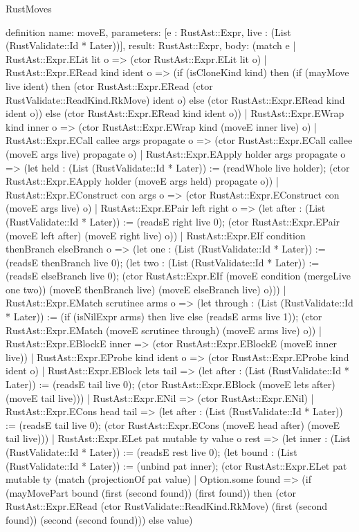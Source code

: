 \begin{lexlean}{RustMoves}
\begin{semanticmodule}
definition{
  name: moveE,
  parameters: [e : RustAst::Expr, live : (List (RustValidate::Id * Later))],
  result: RustAst::Expr,
  body: (match e
    | RustAst::Expr.ELit lit o => (ctor RustAst::Expr.ELit lit o)
    | RustAst::Expr.ERead kind ident o => (if (isCloneKind kind) then (if (mayMove live ident) then (ctor RustAst::Expr.ERead (ctor RustValidate::ReadKind.RkMove) ident o) else (ctor RustAst::Expr.ERead kind ident o)) else (ctor RustAst::Expr.ERead kind ident o))
    | RustAst::Expr.EWrap kind inner o => (ctor RustAst::Expr.EWrap kind (moveE inner live) o)
    | RustAst::Expr.ECall callee args propagate o => (ctor RustAst::Expr.ECall callee (moveE args live) propagate o)
    | RustAst::Expr.EApply holder args propagate o => (let held : (List (RustValidate::Id * Later)) := (readWhole live holder); (ctor RustAst::Expr.EApply holder (moveE args held) propagate o))
    | RustAst::Expr.EConstruct con args o => (ctor RustAst::Expr.EConstruct con (moveE args live) o)
    | RustAst::Expr.EPair left right o => (let after : (List (RustValidate::Id * Later)) := (readsE right live 0); (ctor RustAst::Expr.EPair (moveE left after) (moveE right live) o))
    | RustAst::Expr.EIf condition thenBranch elseBranch o => (let one : (List (RustValidate::Id * Later)) := (readsE thenBranch live 0); (let two : (List (RustValidate::Id * Later)) := (readsE elseBranch live 0); (ctor RustAst::Expr.EIf (moveE condition (mergeLive one two)) (moveE thenBranch live) (moveE elseBranch live) o)))
    | RustAst::Expr.EMatch scrutinee arms o => (let through : (List (RustValidate::Id * Later)) := (if (isNilExpr arms) then live else (readsE arms live 1)); (ctor RustAst::Expr.EMatch (moveE scrutinee through) (moveE arms live) o))
    | RustAst::Expr.EBlockE inner => (ctor RustAst::Expr.EBlockE (moveE inner live))
    | RustAst::Expr.EProbe kind ident o => (ctor RustAst::Expr.EProbe kind ident o)
    | RustAst::Expr.EBlock lets tail => (let after : (List (RustValidate::Id * Later)) := (readsE tail live 0); (ctor RustAst::Expr.EBlock (moveE lets after) (moveE tail live)))
    | RustAst::Expr.ENil => (ctor RustAst::Expr.ENil)
    | RustAst::Expr.ECons head tail => (let after : (List (RustValidate::Id * Later)) := (readsE tail live 0); (ctor RustAst::Expr.ECons (moveE head after) (moveE tail live)))
    | RustAst::Expr.ELet pat mutable ty value o rest => (let inner : (List (RustValidate::Id * Later)) := (readsE rest live 0); (let bound : (List (RustValidate::Id * Later)) := (unbind pat inner); (ctor RustAst::Expr.ELet pat mutable ty (match (projectionOf pat value)
      | Option.some found => (if (mayMovePart bound (first (second found)) (first found)) then (ctor RustAst::Expr.ERead (ctor RustValidate::ReadKind.RkMove) (first (second found)) (second (second found))) else value)
}
\end{semanticmodule}
\end{lexlean}
